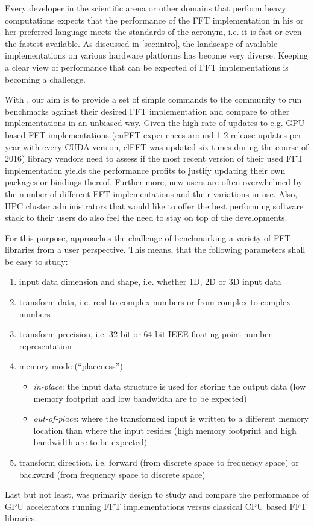 Every developer in the scientific arena or other domains that perform heavy computations expects that the performance of the FFT implementation in his or her preferred language meets the standards of the acronym, i.e. it is fast or even the fastest available. As discussed in \cref{sec:intro}, the landscape of available implementations on various hardware platforms has become very diverse. Keeping a clear view of performance that can be expected of FFT implementations is becoming a challenge. 

With \gearshifft{}, our aim is to provide a set of simple commands to the community to run benchmarks against their desired FFT implementation and compare to other implementations in an unbiased way. Given the high rate of updates to e.g. GPU based FFT implementations (cuFFT experiences around 1-2 release updates per year with every CUDA version, clFFT was updated six times during the course of 2016) library vendors need to assess if the most recent version of their used FFT implementation yields the performance profits to justify updating their own packages or bindings thereof. Further more, new users are often overwhelmed by the number of different FFT implementations and their variations in use. Also, HPC cluster administrators that would like to offer the best performing software stack to their users do also feel the need to stay on top of the developments. 

For this purpose, \gearshifft{} approaches the challenge of benchmarking a variety of FFT libraries from a user perspective. This means, that the following parameters shall be easy to study:

\begin{enumerate}
\item input data dimension and shape, i.e. whether 1D, 2D or 3D input data
\item transform data, i.e. real to complex numbers or from complex to complex numbers
\item transform precision, i.e. 32-bit or 64-bit IEEE floating point number representation
\item memory mode (``placeness'')
  \begin{itemize}
  \item \emph{in-place}: the input data structure is used for storing the output data (low memory footprint and low bandwidth are to be expected)
  \item \emph{out-of-place}:  where the transformed input is written to a different memory location than where the input resides (high memory footprint and high bandwidth are to be expected)
  \end{itemize}
\item transform direction, i.e. forward (from discrete space to frequency space) or backward (from frequency space to discrete space)
\end{enumerate}
 
Last but not least, \gearshifft{} was primarily design to study and compare the performance of GPU accelerators running FFT implementations versus classical CPU based FFT libraries.   
